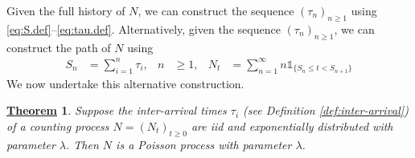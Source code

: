 \documentclass[12pt]{book}
\numberwithin{equation}{chapter}
\theoremstyle{plain}
\newtheorem{theorem}{\underline{Theorem}}
\numberwithin{theorem}{section}
\theoremstyle{definition}
\numberwithin{exercise}{chapter}
\newcommand{\<}{\langle}
\renewcommand{\>}{\rangle}
\renewcommand{\(}{\left(}
\renewcommand{\)}{\right)}
\renewcommand{\[}{\left[}
\renewcommand{\]}{\right]}
\newcommand\Ib{\mathds{1}} 	%
\newcommand\Ec{\mathscr{E}}
\newcommand\lam{\lambda}
\begin{document}
\noindent
Given the full history of $N$, we can construct the sequence $(\tau_n)_{n \geq 1}$ using \eqref{eq:S.def}--\eqref{eq:tau.def}.  Alternatively, given the sequence $(\tau_n)_{n \geq 1}$, we can construct the path of $N$ using
\begin{align}
S_n
	&=	\sum_{i=1}^n \tau_i , &
n
	&\geq 1 , &
N_t
	&=	\sum_{n=1}^\infty n \Ib_{\{S_n \leq t < S_{n+1}\}} \label{eq:S=sum.tau}
\end{align}
We now undertake this alternative construction.

\begin{theorem}
\label{thm:construction.poisson}
Suppose the inter-arrival times $\tau_i$ (see Definition \ref{def:inter-arrival}) of a counting process $N = (N_t)_{t \geq 0}$ are iid and exponentially distributed with parameter $\lam$.  Then $N$ is a Poisson process with parameter $\lam$.
\end{theorem}
\end{document}
